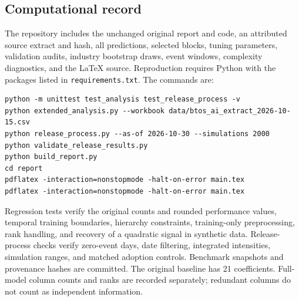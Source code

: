 






\par\medskip
\subsection{Computational record}
The repository includes the unchanged original report and code, an attributed source extract and hash, all predictions, selected blocks, tuning parameters, validation audits, industry bootstrap draws, event windows, complexity diagnostics, and the LaTeX source. Reproduction requires Python with the packages listed in \texttt{requirements.txt}. The commands are:
\begin{verbatim}
python -m unittest test_analysis test_release_process -v
python extended_analysis.py --workbook data/btos_ai_extract_2026-10-15.csv
python release_process.py --as-of 2026-10-30 --simulations 2000
python validate_release_results.py
python build_report.py
cd report
pdflatex -interaction=nonstopmode -halt-on-error main.tex
pdflatex -interaction=nonstopmode -halt-on-error main.tex
\end{verbatim}
Regression tests verify the original counts and rounded performance values, temporal training boundaries, hierarchy constraints, training-only preprocessing, rank handling, and recovery of a quadratic signal in synthetic data. Release-process checks verify zero-event days, date filtering, integrated intensities, simulation ranges, and matched adoption controls. Benchmark snapshots and provenance hashes are committed. The original baseline has 21 coefficients. Full-model column counts and ranks are recorded separately; redundant columns do not count as independent information.
